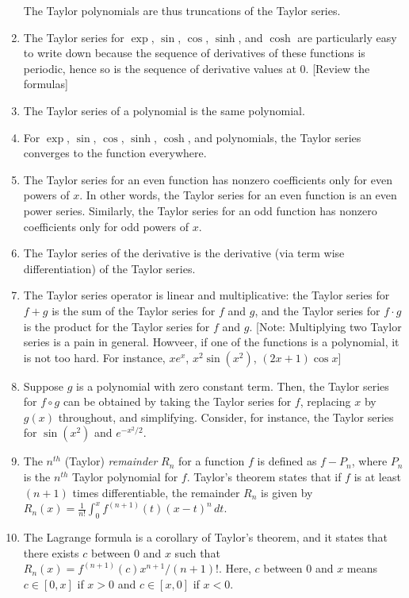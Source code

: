 \documentclass{amsart}
\begin{document}
\begin{enumerate}
  The Taylor polynomials are thus truncations of the Taylor series.
\item The Taylor series for $\exp$, $\sin$, $\cos$, $\sinh$, and
  $\cosh$ are particularly easy to write down because the sequence of
  derivatives of these functions is periodic, hence so is the sequence
  of derivative values at $0$. [Review the formulas]
\item The Taylor series of a polynomial is the same polynomial.
\item For $\exp$, $\sin$, $\cos$, $\sinh$, $\cosh$, and polynomials,
  the Taylor series converges to the function everywhere.
\item The Taylor series for an even function has nonzero coefficients
  only for even powers of $x$. In other words, the Taylor series for
  an even function is an even power series. Similarly, the Taylor
  series for an odd function has nonzero coefficients only for odd
  powers of $x$.
\item The Taylor series of the derivative is the derivative (via term
  wise differentiation) of the Taylor series.
\item The Taylor series operator is linear and multiplicative: the
  Taylor series for $f + g$ is the sum of the Taylor series for $f$
  and $g$, and the Taylor series for $f \cdot g$ is the product for
  the Taylor series for $f$ and $g$. [Note: Multiplying two Taylor
  series is a pain in general. Howveer, if one of the functions is a
  polynomial, it is not too hard. For instance, $xe^x$, $x^2 \sin
  (x^2)$, $(2x + 1)\cos x$]
\item Suppose $g$ is a polynomial with zero constant term. Then, the
  Taylor series for $f \circ g$ can be obtained by taking the Taylor
  series for $f$, replacing $x$ by $g(x)$ throughout, and
  simplifying. Consider, for instance, the Taylor series for
  $\sin(x^2)$ and $e^{-x^2/2}$.
\item The $n^{th}$ (Taylor) {\em remainder} $R_n$ for a function $f$
  is defined as $f - P_n$, where $P_n$ is the $n^{th}$ Taylor
  polynomial for $f$. Taylor's theorem states that if $f$ is at least
  $(n + 1)$ times differentiable, the remainder $R_n$ is given by
  $R_n(x) = \frac{1}{n!} \int_0^x f^{(n +1)}(t) (x - t)^n \, dt$.
\item The Lagrange formula is a corollary of Taylor's theorem, and it
  states that there exists $c$ between $0$ and $x$ such that $R_n(x) =
  f^{(n + 1)}(c)x^{n+1}/(n + 1)!$. Here, $c$ between $0$ and $x$ means
  $c \in [0,x]$ if $x > 0$ and $c \in [x,0]$ if $x < 0$.

\end{enumerate}
\end{document}
